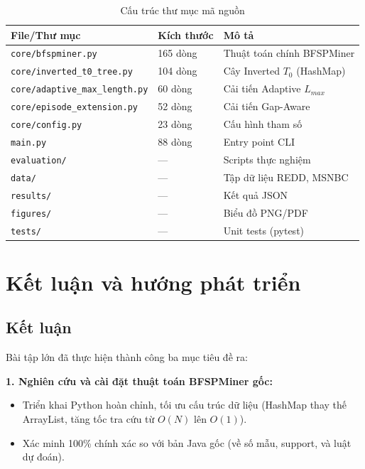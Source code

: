 \documentclass[14pt,a4paper,oneside]{extreport}
\begin{document}
\begin{table}[H]
    \centering
    \caption{Cấu trúc thư mục mã nguồn}
    \label{tab:structure}
    \begin{tabular}{lll}
        \toprule
        \textbf{File/Thư mục} & \textbf{Kích thước} & \textbf{Mô tả} \\
        \midrule
        \texttt{core/bfspminer.py}          & 165 dòng & Thuật toán chính BFSPMiner \\
        \texttt{core/inverted\_t0\_tree.py} & 104 dòng & Cây Inverted $T_0$ (HashMap) \\
        \texttt{core/adaptive\_max\_length.py} & 60 dòng & Cải tiến Adaptive $L_{max}$ \\
        \texttt{core/episode\_extension.py} & 52 dòng  & Cải tiến Gap-Aware \\
        \texttt{core/config.py}             & 23 dòng  & Cấu hình tham số \\
        \texttt{main.py}                    & 88 dòng  & Entry point CLI \\
        \texttt{evaluation/}               & ---       & Scripts thực nghiệm \\
        \texttt{data/}                      & ---       & Tập dữ liệu REDD, MSNBC \\
        \texttt{results/}                   & ---       & Kết quả JSON \\
        \texttt{figures/}                   & ---       & Biểu đồ PNG/PDF \\
        \texttt{tests/}                     & ---       & Unit tests (pytest) \\
        \bottomrule
    \end{tabular}
\end{table}

\chapter{Kết luận và hướng phát triển}
\label{chap:conclusion}

\section{Kết luận}
Bài tập lớn đã thực hiện thành công ba mục tiêu đề ra:

\textbf{1. Nghiên cứu và cài đặt thuật toán BFSPMiner gốc:}
\begin{itemize}
    \item Triển khai Python hoàn chỉnh, tối ưu cấu trúc dữ liệu (HashMap thay thế ArrayList, tăng tốc tra cứu từ $O(N)$ lên $O(1)$).
    \item Xác minh 100\% chính xác so với bản Java gốc (về số mẫu, support, và luật dự đoán).
\end{itemize}
\end{document}
